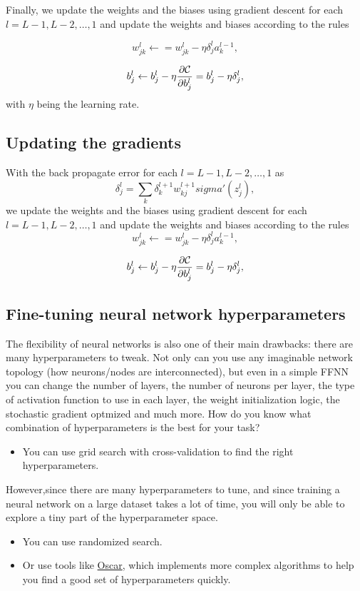 \documentclass[%
oneside,                 %
final,                   %
10pt]{article}
\begin{document}
Finally, we update the weights and the biases using gradient descent
for each $l=L-1,L-2,\dots,1$ and update the weights and biases
according to the rules

\[
w_{jk}^l\leftarrow  = w_{jk}^l- \eta \delta_j^la_k^{l-1},
\]

\[
b_j^l \leftarrow b_j^l-\eta \frac{\partial {\cal C}}{\partial b_j^l}=b_j^l-\eta \delta_j^l,
\]
with $\eta$ being the learning rate.

\subsection{Updating the gradients}

With the back propagate error for each $l=L-1,L-2,\dots,1$ as
\[
\delta_j^l = \sum_k \delta_k^{l+1}w_{kj}^{l+1}sigma'(z_j^l),
\]
we update the weights and the biases using gradient descent for each $l=L-1,L-2,\dots,1$ and update the weights and biases according to the rules
\[
w_{jk}^l\leftarrow  = w_{jk}^l- \eta \delta_j^la_k^{l-1},
\]

\[
b_j^l \leftarrow b_j^l-\eta \frac{\partial {\cal C}}{\partial b_j^l}=b_j^l-\eta \delta_j^l,
\]

\subsection{Fine-tuning neural network hyperparameters}

The flexibility of neural networks is also one of their main
drawbacks: there are many hyperparameters to tweak. Not only can you
use any imaginable network topology (how neurons/nodes are
interconnected), but even in a simple FFNN you can change the number
of layers, the number of neurons per layer, the type of activation
function to use in each layer, the weight initialization logic, the
stochastic gradient optmized and much more. How do you know what
combination of hyperparameters is the best for your task?

\begin{itemize}
\item You can use grid search with cross-validation to find the right hyperparameters.
\end{itemize}

\noindent
However,since there are many hyperparameters to tune, and since
training a neural network on a large dataset takes a lot of time, you
will only be able to explore a tiny part of the hyperparameter space.

\begin{itemize}
\item You can use randomized search.

\item Or use tools like \href{{http://oscar.calldesk.ai/}}{Oscar}, which implements more complex algorithms to help you find a good set of hyperparameters quickly.  
\end{itemize}
\end{document}
